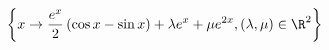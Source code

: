 \begin{displaymath}
 \left\lbrace 
x\rightarrow \frac{e^{x}}{2}\left(\cos x -\sin x \right) +\lambda e^x + \mu e^{2x},(\lambda,\mu)\in \R^2 
\right\rbrace 
\end{displaymath}
